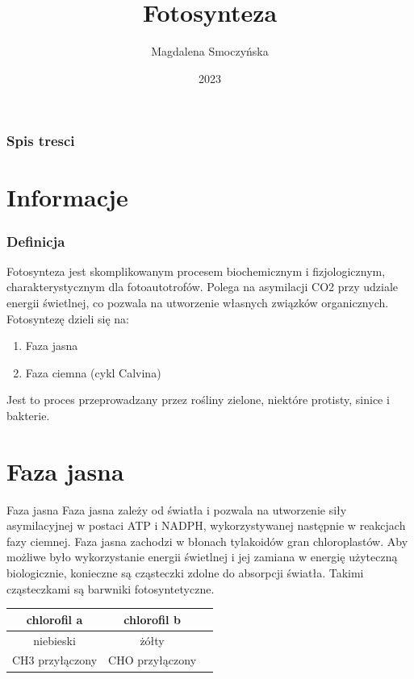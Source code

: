 \documentclass{beamer}
\title{Fotosynteza}
\author{Magdalena Smoczyńska}
\institute{Uniwersytet Gdański}
\date{2023}
\begin{document}
	
	\frame{\titlepage}
	\begin{frame}
		\frametitle{Spis tresci}
		\tableofcontents
	\end{frame}

\section{Informacje}
	\begin{frame}
		\frametitle{Definicja}
		Fotosynteza jest skomplikowanym procesem biochemicznym i fizjologicznym, charakterystycznym dla fotoautotrofów. Polega na asymilacji CO2 przy udziale energii świetlnej, co pozwala na utworzenie własnych związków organicznych. Fotosyntezę dzieli się na:
		\begin{enumerate}
			\item Faza jasna
			\item Faza ciemna (cykl Calvina)
		\end{enumerate}
		 Jest to proces przeprowadzany przez rośliny zielone, niektóre protisty, sinice i bakterie.
	\end{frame}

\section{Faza jasna}
	\begin{frame}{Faza jasna}
		Faza jasna zależy od światła i pozwala na utworzenie siły asymilacyjnej w postaci ATP i NADPH, wykorzystywanej następnie w reakcjach fazy ciemnej. Faza jasna zachodzi w błonach tylakoidów gran chloroplastów. Aby możliwe było wykorzystanie energii świetlnej i jej zamiana w energię użyteczną biologicznie, konieczne są cząsteczki zdolne do absorpcji światła. Takimi cząsteczkami są barwniki fotosyntetyczne.
		\begin{table}
			\hfill
		\begin{tabular}{|c||c||c|}
			\hline
			chlorofil a & chlorofil b \\ 
			\hline
			niebieski & żółty\\ 
			\hline
			CH3 przyłączony & CHO przyłączony\\ 
			\hline
		\end{tabular}
		\end{table}
	\end{frame}
\end{document}
